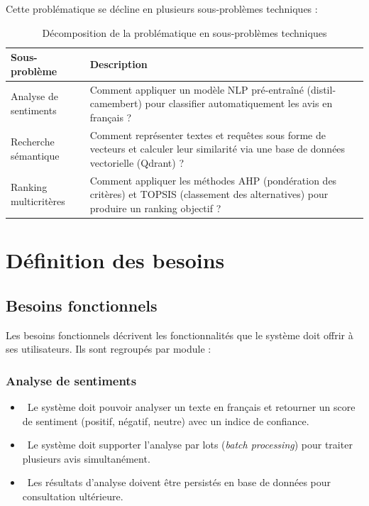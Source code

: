\documentclass[11pt,a4paper]{report}
\newcommand{\statusok}{\textcolor{arasSuccess}{\faCheckCircle}}
\begin{document}
Cette problématique se décline en plusieurs sous-problèmes techniques :

\begin{table}[H]
\centering
\caption{Décomposition de la problématique en sous-problèmes techniques}
\label{tab:subproblems}
\begin{tabular}{>{\raggedright}p{3.5cm} >{\raggedright\arraybackslash}p{9cm}}
\toprule
\textbf{Sous-problème} & \textbf{Description} \\
\midrule
\rowcolor{arasLight}
Analyse de sentiments & Comment appliquer un modèle NLP pré-entraîné (distil-camembert) pour classifier automatiquement les avis en français ? \\
Recherche sémantique & Comment représenter textes et requêtes sous forme de vecteurs et calculer leur similarité via une base de données vectorielle (Qdrant) ? \\
\rowcolor{arasLight}
Ranking multicritères & Comment appliquer les méthodes AHP (pondération des critères) et TOPSIS (classement des alternatives) pour produire un ranking objectif ? \\
\bottomrule
\end{tabular}
\end{table}

\section{Définition des besoins}

\subsection{Besoins fonctionnels}

Les besoins fonctionnels décrivent les fonctionnalités que le système doit offrir à ses utilisateurs. Ils sont regroupés par module :

\subsubsection*{Analyse de sentiments}

\begin{itemize}
    \item \statusok\ Le système doit pouvoir analyser un texte en français et retourner un score de sentiment (positif, négatif, neutre) avec un indice de confiance.
    \item \statusok\ Le système doit supporter l'analyse par lots (\textit{batch processing}) pour traiter plusieurs avis simultanément.
    \item \statusok\ Les résultats d'analyse doivent être persistés en base de données pour consultation ultérieure.
\end{itemize}
\end{document}
